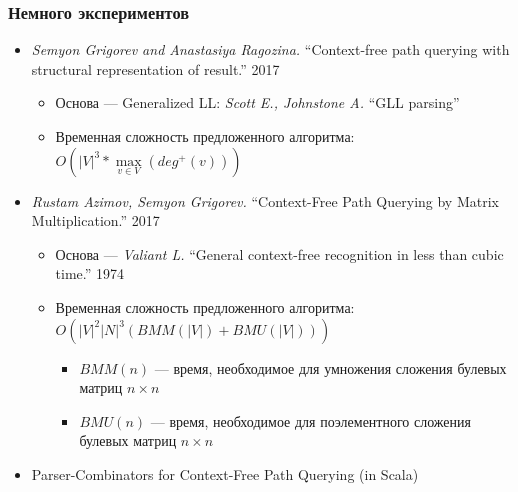 \documentclass[xcolor=table,aspectratio=169]{beamer}
\begin{document}
\begin{frame}[fragile]
  \transwipe[direction=90]
  \frametitle{Немного экспериментов}

\begin{itemize} 
\item \emph{Semyon Grigorev and Anastasiya Ragozina.} ``Context-free path querying with structural representation of result.'' 2017
\begin{itemize} 
  \item Основа --- Generalized LL: \emph{Scott E., Johnstone A.} ``GLL parsing''
  \item Временная сложность предложенного алгоритма: $O\left(|V|^3*\max\limits_{v \in V}\left(deg^+\left(v\right)\right)\right)$
\end{itemize}
\item \emph{Rustam Azimov, Semyon Grigorev.} ``Context-Free Path Querying by Matrix Multiplication.'' 2017
\begin{itemize} 
   \item Основа --- \emph{Valiant L.} ``General context-free recognition in less than cubic time.'' 1974
   \item Временная сложность предложенного алгоритма: $O(|V|^2 |N|^3(BMM(|V|) + BMU (|V|)))$
     \begin{itemize} 
      \item $BMM(n)$ --- время, необходимое для умножения сложения булевых матриц $n\times n$
      \item $BMU(n)$ --- время, необходимое для поэлементного сложения булевых матриц $n\times n$
     \end{itemize}
\end{itemize}
\item Parser-Combinators for Context-Free Path Querying (in Scala)
\end{itemize}
\end{frame}
\end{document}
